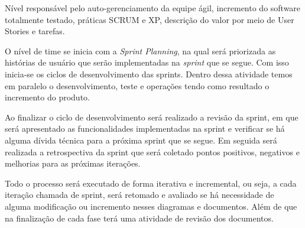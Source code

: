 Nível responsável pelo auto-gerenciamento da equipe ágil, incremento do software totalmente testado, práticas SCRUM e XP, descrição do valor por meio de User Stories e tarefas.

O nível de time se inicia com a \textit{Sprint Planning}, na qual será priorizada as histórias de usuário que serão implementadas na \textit{sprint} que se segue. Com isso inicia-se os ciclos de desenvolvimento das sprints. Dentro dessa atividade temos em paralelo o desenvolvimento, teste e operações tendo como resultado o incremento do produto.

Ao finalizar o ciclo de desenvolvimento será realizado a revisão da sprint, em que será apresentado as funcionalidades implementadas na sprint e verificar se há alguma dívida técnica para a próxima sprint que se segue. Em seguida será realizada a retrospectiva da sprint que será coletado pontos positivos, negativos e melhorias para as próximas iterações.

Todo o processo será executado de forma iterativa e incremental, ou seja, a cada iteração chamada de sprint, será retomado e avaliado se há necessidade de alguma modificação ou incremento nesses diagramas e documentos. Além de que na finalização de cada fase terá uma atividade de revisão dos documentos.
